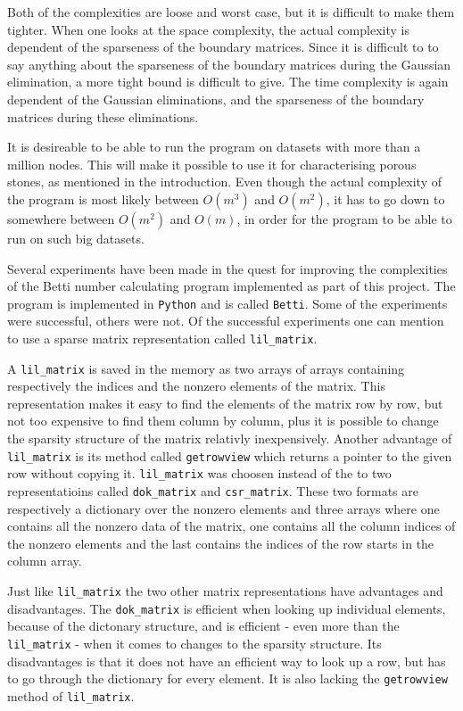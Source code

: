 \documentclass[11pt,a4paper,twoside]{report}
\begin{document}
Both of the complexities are loose and worst case, but it is difficult to make them tighter. When one looks at the space complexity, the actual complexity is dependent of the sparseness of the boundary matrices. Since it is difficult to to say anything about the sparseness of the boundary matrices during the Gaussian elimination, a more tight bound is difficult to give. The time complexity is again dependent of the Gaussian eliminations, and the sparseness of the boundary matrices during these eliminations. 

It is desireable to be able to run the program on datasets with more than a million nodes. This will make it possible to use it for characterising porous stones, as mentioned in the introduction. Even though the actual complexity of the program is most likely between $O(m^3)$ and $O(m^2)$, it has to go down to somewhere between $O(m^2)$ and $O(m)$, in order for the program to be able to run on such big datasets.

Several experiments have been made in the quest for improving the complexities of the Betti number calculating program implemented as part of this project. The program is implemented in \texttt{Python} and is called \texttt{Betti}. Some of the experiments were successful, others were not. Of the successful experiments one can mention to use a sparse matrix representation called \texttt{lil\_matrix}. 

A \texttt{lil\_matrix} is saved in the memory as two arrays of arrays containing respectively the indices and the nonzero elements of the matrix\cite{csr}. This representation makes it easy to find the elements of the matrix row by row, but not too expensive to find them column by column, plus it is possible to change the sparsity structure of the matrix relativly inexpensively. Another advantage of \texttt{lil\_matrix} is its method called \texttt{getrowview} which returns a pointer to the given row without copying it. \texttt{lil\_matrix} was choosen instead of the to two representatioins called \texttt{dok\_matrix} and \texttt{csr\_matrix}. These two formats are respectively a dictionary over the nonzero elements\cite{wikiSparse} and three arrays where one contains all the nonzero data of the matrix, one contains all the column indices of the nonzero elements and the last contains the indices of the row starts in the column array\cite{karlrupp}.

Just like \texttt{lil\_matrix} the two other matrix representations have advantages and disadvantages. The \texttt{dok\_matrix} is efficient when looking up individual elements, because of the dictonary structure, and is efficient - even more than the \texttt{lil\_matrix} - when it comes to changes to the sparsity structure. Its disadvantages is that it does not have an efficient way to look up a row, but has to go through the dictionary for every element. It is also lacking the \texttt{getrowview} method of \texttt{lil\_matrix}\cite{dok}. 
\end{document}
